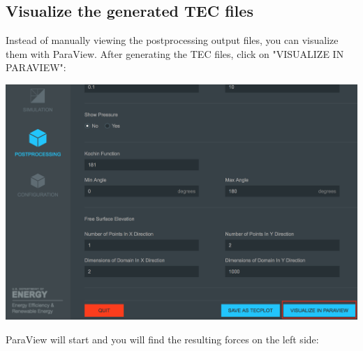 \documentclass[12pt]{article}
\begin{document}
\subsection{Visualize the generated TEC files}

Instead of manually viewing the postprocessing output files, you can visualize them with ParaView. After generating the TEC files, click on "VISUALIZE IN PARAVIEW":

\vspace{\abovedisplayskip}
\begin{minipage}{\linewidth}
	\centering
	\includegraphics[scale=0.4]{img/37}
\end{minipage}
\vspace{\belowdisplayskip}

ParaView will start and you will find the resulting forces on the left side:
\end{document}
